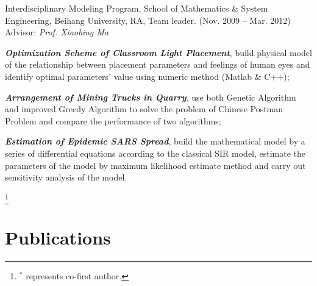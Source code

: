 \documentclass[10pt,letterpaper]{article}
\renewenvironment{itemize}{
\begin{list}{}{
    \setlength{\leftmargin}{1.5em}
    \setlength{\itemsep}{0.25em}
    \setlength{\parskip}{0pt}
    \setlength{\parsep}{0.25em}
    }
    }{
\end{list}
}
\begin{document}
\begin{itemize}
    \item Interdisciplinary Modeling Program, School of Mathematics \& System Engineering, Beihang University, RA, Team leader. (Nov. 2009 -- Mar. 2012) \\
    Advisor: \textit{Prof. Xiaobing Ma}
    \begin{itemize}
        \item \textbf{\textit{Optimization Scheme of Classroom Light Placement}}, build physical model of the relationship between placement parameters and feelings of human eyes and identify optimal parameters' value using numeric method (Matlab \& C++);
        \item \textit{\textbf{Arrangement of Mining Trucks in Quarry}}, use both Genetic Algorithm and improved Greedy Algorithm to solve the problem of Chinese Postman Problem and compare the performance of two algorithms;
        \item \textbf{\textit{Estimation of Epidemic SARS Spread}}, build the mathematical model by a series of differential equations according to the classical SIR model, estimate the parameters of the model by maximum likelihood estimate method and carry out sensitivity analysis of the model.
    \end{itemize}
\end{itemize}

\newpage
\let\thefootnote\relax\footnote{$^*$ represents co-first author.}

\section*{Publications}
\end{document}

